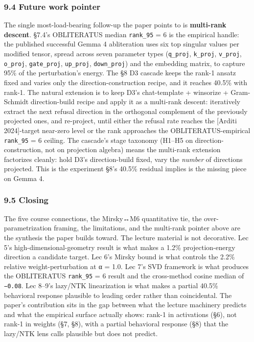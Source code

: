 \documentclass[
  11pt,
]{article}
\begin{document}
\subsubsection{9.4 Future work pointer}\label{future-work-pointer}

The single most-load-bearing follow-up the paper points to is
\textbf{multi-rank descent}. §7.4's OBLITERATUS median \texttt{rank\_95}
= 6 is the empirical handle: the published successful Gemma 4
abliteration uses six top singular values per modified tensor, spread
across seven parameter types (\texttt{q\_proj}, \texttt{k\_proj},
\texttt{v\_proj}, \texttt{o\_proj}, \texttt{gate\_proj},
\texttt{up\_proj}, \texttt{down\_proj}) and the embedding matrix, to
capture 95\% of the perturbation's energy. The §8 D3 cascade keeps the
rank-1 ansatz fixed and varies only the direction-construction recipe,
and it reaches 40.5\% with rank-1. The natural extension is to keep D3's
chat-template + winsorize + Gram-Schmidt direction-build recipe and
apply it as a multi-rank descent: iteratively extract the next refusal
direction in the orthogonal complement of the previously projected ones,
and re-project, until either the refusal rate reaches the {[}Arditi
2024{]}-target near-zero level or the rank approaches the
OBLITERATUS-empirical \texttt{rank\_95} = 6 ceiling. The cascade's stage
taxonomy (H1--H5 on direction-construction, not on projection algebra)
means the multi-rank extension factorizes cleanly: hold D3's
direction-build fixed, vary the \emph{number} of directions projected.
This is the experiment §8's 40.5\% residual implies is the missing piece
on Gemma 4.

\subsubsection{9.5 Closing}\label{closing}

The five course connections, the Mirsky↔M6 quantitative tie, the
over-parametrization framing, the limitations, and the multi-rank
pointer above are the synthesis the paper builds toward. The lecture
material is not decorative. Lec 5's high-dimensional-geometry result is
what makes a 1.2\% projection-energy direction a candidate target. Lec
6's Mirsky bound is what controls the 2.2\% relative weight-perturbation
at α = 1.0. Lec 7's SVD framework is what produces the OBLITERATUS
\texttt{rank\_95} = 6 result and the cross-method cosine median of
\texttt{−0.08}. Lec 8--9's lazy/NTK linearization is what makes a
partial 40.5\% behavioral response plausible to leading order rather
than coincidental. The paper's contribution sits in the gap between what
the lecture machinery predicts and what the empirical surface actually
shows: rank-1 in activations (§6), not rank-1 in weights (§7, §8), with
a partial behavioral response (§8) that the lazy/NTK lens calls
plausible but does not predict.
\end{document}
